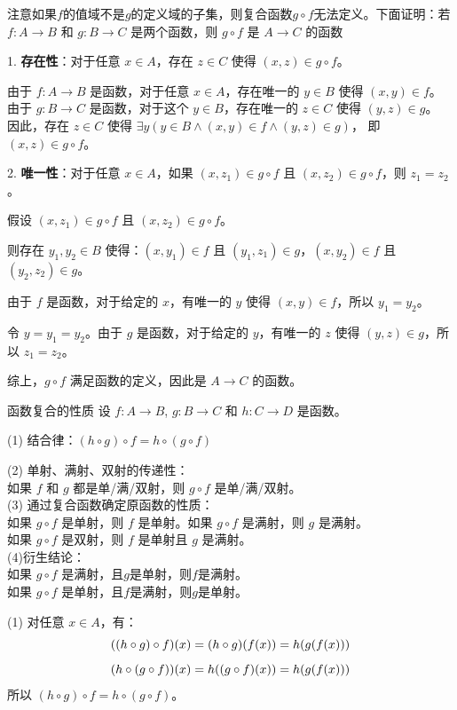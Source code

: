 \documentclass[lang=cn,11pt]{elegantbook}
\begin{document}
注意如果$f$的值域不是$g$的定义域的子集，则复合函数$g\circ f$无法定义。下面证明：若$f: A \to B$ 和 $g: B \to C$ 是两个函数，则 $g \circ f$ 是 $A \to C$ 的函数

1. \textbf{存在性}：对于任意 $x \in A$，存在 $z \in C$ 使得 $(x,z) \in g \circ f$。

由于 $f: A \to B$ 是函数，对于任意 $x \in A$，存在唯一的 $y \in B$ 使得 $(x,y) \in f$。
由于 $g: B \to C$ 是函数，对于这个 $y \in B$，存在唯一的 $z \in C$ 使得 $(y,z) \in g$。
因此，存在 $z \in C$ 使得 $\exists y (y \in B \land (x,y) \in f \land (y,z) \in g)$，
即 $(x,z) \in g \circ f$。

2. \textbf{唯一性}：对于任意 $x \in A$，如果 $(x,z_1) \in g \circ f$ 且 $(x,z_2) \in g \circ f$，则 $z_1 = z_2$。

假设 $(x,z_1) \in g \circ f$ 且 $(x,z_2) \in g \circ f$。

则存在 $y_1, y_2 \in B$ 使得：$(x,y_1) \in f$ 且 $(y_1,z_1) \in g$，$(x,y_2) \in f$ 且 $(y_2,z_2) \in g$。

由于 $f$ 是函数，对于给定的 $x$，有唯一的 $y$ 使得 $(x,y) \in f$，所以 $y_1 = y_2$。

令 $y = y_1 = y_2$。由于 $g$ 是函数，对于给定的 $y$，有唯一的 $z$ 使得 $(y,z) \in g$，所以 $z_1 = z_2$。

综上，$g \circ f$ 满足函数的定义，因此是 $A \to C$ 的函数。
\begin{theorem}{函数复合的性质}
设 $f: A \to B$, $g: B \to C$ 和 $h: C \to D$ 是函数。

(1) 结合律：$(h \circ g) \circ f = h \circ (g \circ f)$

(2) 单射、满射、双射的传递性：\\
如果 $f$ 和 $g$ 都是单/满/双射，则 $g \circ f$ 是单/满/双射。\\
(3) 通过复合函数确定原函数的性质：\\
如果 $g \circ f$ 是单射，则 $f$ 是单射。如果 $g \circ f$ 是满射，则 $g$ 是满射。\\
如果 $g \circ f$ 是双射，则 $f$ 是单射且 $g$ 是满射。\\
(4)衍生结论：\\
如果 $g \circ f$ 是满射，且$g$是单射，则$f$是满射。 \\
如果 $g \circ f$ 是单射，且$f$是满射，则$g$是单射。
\end{theorem}
(1) 对任意 $x \in A$，有：\vspace{-10pt}
\[
((h \circ g) \circ f)(x) = (h \circ g)(f(x)) = h(g(f(x)))\vspace{-10pt}
\]
\[
(h \circ (g \circ f))(x) = h((g \circ f)(x)) = h(g(f(x)))\vspace{-10pt}
\]
所以 $(h \circ g) \circ f = h \circ (g \circ f)$。
\end{document}
